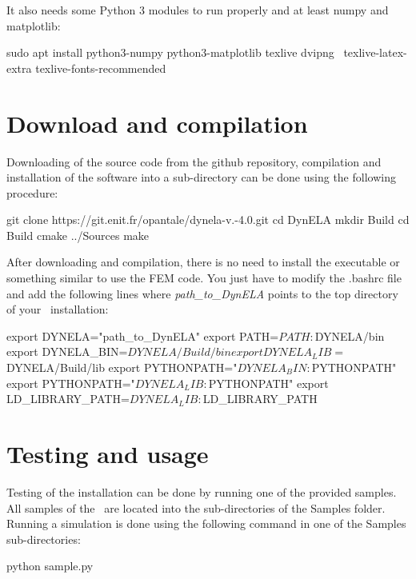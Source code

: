 It also needs some Python 3 modules to run properly and at least numpy and matplotlib:

\begin{BashListing}[numbers=none]
sudo apt install python3-numpy python3-matplotlib texlive dvipng \
texlive-latex-extra texlive-fonts-recommended
\end{BashListing}

\section{Download and compilation}

Downloading of the source code from the github repository, compilation and installation of the software into a sub-directory can be done using the following procedure:

\begin{BashListing}[numbers=none]
git clone https://git.enit.fr/opantale/dynela-v.-4.0.git
cd DynELA
mkdir Build
cd Build
cmake ../Sources
make
\end{BashListing}

After downloading and compilation, there is no need to install the executable or something similar to use the FEM code. You just have to modify the \textsf{.bashrc} file and add the following lines where \emph{path\_to\_DynELA} points to the top directory of your \DynELA~installation:

\begin{BashListing}[numbers=none]
export DYNELA="path_to_DynELA"
export PATH=$PATH:$DYNELA/bin
export DYNELA_BIN=$DYNELA/Build/bin
export DYNELA_LIB=$DYNELA/Build/lib
export PYTHONPATH="$DYNELA_BIN:$PYTHONPATH"
export PYTHONPATH="$DYNELA_LIB:$PYTHONPATH"
export LD_LIBRARY_PATH=$DYNELA_LIB:$LD_LIBRARY_PATH
\end{BashListing}

\section{Testing and usage}

Testing of the installation can be done by running one of the provided samples. All samples of the \DynELA~are located into the sub-directories of the Samples folder. Running a simulation is done using the following command in one of the Samples sub-directories:

\begin{BashListing}[numbers=none]
python sample.py
\end{BashListing}

